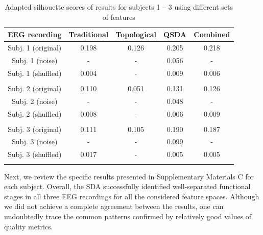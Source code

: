 \documentclass[pdflatex,sn-basic,Numbered]{sn-jnl}
\begin{document}
\begin{table}
\caption{Adapted silhouette scores of results for subjects 1 -- 3 using different sets of features}
\label{table1}
\begin{tabular}{ccccc}
\toprule
        EEG recording & Traditional & Topological & QSDA & Combined\\
\midrule
        Subj. 1 (original)       & 0.198 & 0.126 & 0.205 & 0.218 \\
        Subj. 1 (noise)          & -     & -     & 0.056 & -     \\
        Subj. 1 (shuffled)       & 0.004 & -     & 0.009 & 0.006 \\
        \\
        Subj. 2 (original)       & 0.110 & 0.051 & 0.131 & 0.126 \\
        Subj. 2 (noise)          & -     & -     & 0.048 & -     \\
        Subj. 2 (shuffled)       & 0.008 & -     & 0.006 & 0.009 \\
        \\
        Subj. 3 (original)       & 0.111 & 0.105 & 0.190 & 0.187 \\
        Subj. 3 (noise)          & -     & -     & 0.099 & -     \\
        Subj. 3 (shuffled)       & 0.017 & -     & 0.005 & 0.005 \\
\botrule
\end{tabular}
\end{table}

Next, we review the specific results presented in Supplementary Materials C for each subject. Overall, the SDA successfully identified well-separated functional stages in all three EEG recordings for all the considered feature spaces. Although we did not achieve a complete agreement between the results, one can undoubtedly trace the common patterns confirmed by relatively good values of quality metrics.
\end{document}
